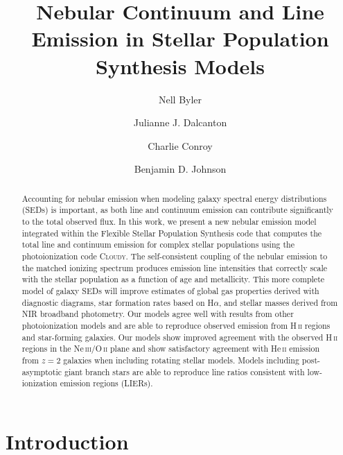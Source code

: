 \documentclass[trackchanges, twocolumn, tighten]{aastex61}
\begin{document}
\title{Nebular Continuum and Line Emission in Stellar Population Synthesis Models}


\author[0000-0002-7392-3637]{Nell Byler}

\author[0000-0002-1264-2006]{Julianne J. Dalcanton}

\author[0000-0002-1590-8551]{Charlie Conroy}

\author{Benjamin D. Johnson}

\begin{abstract}
Accounting for nebular emission when modeling galaxy spectral energy distributions (SEDs) is important, as both line and continuum emission can contribute significantly to the total observed flux. In this work, we present a new nebular emission model integrated within the Flexible Stellar Population Synthesis code that computes the total line and continuum emission for complex stellar populations using the photoionization code \textsc{Cloudy}. The self-consistent coupling of the nebular emission to the matched ionizing spectrum produces emission line intensities that correctly scale with the stellar population as a function of age and metallicity. This more complete model of galaxy SEDs will improve estimates of global gas properties derived with diagnostic diagrams, star formation rates based on H$\alpha$, and stellar masses derived from NIR broadband photometry. Our models agree well with results from other photoionization models and are able to reproduce observed emission from H\,\textsc{ii} regions and star-forming galaxies. Our models show improved agreement with the observed H\,\textsc{ii} regions in the Ne\,\textsc{iii}/O\,\textsc{ii} plane and show satisfactory agreement with He\,\textsc{ii} emission from $z=2$ galaxies when including rotating stellar models. Models including post-asymptotic giant branch stars are able to reproduce line ratios consistent with low-ionization emission regions (LIERs).
\end{abstract}

\section{Introduction} \label{sec:introduction}
\end{document}
